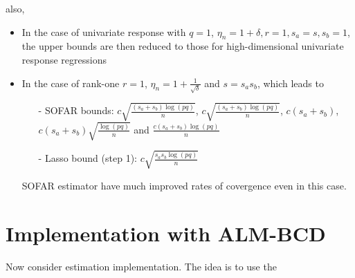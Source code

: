 \documentclass[twoside]{article}
\begin{document}
also,
\begin{itemize}
    \item In the case of univariate response with $q=1$, $\eta_n=1+\delta,r=1,s_a=s,s_b=1$, the upper bounds are then reduced to those for high-dimensional univariate response regressions
    \item In the case of rank-one $r=1$, $\eta_n = 1+\frac{1}{\sqrt{\delta}}$ and $s=s_as_b$, which leads to
    \begin{itemize}
        \item[-] SOFAR bounds: $c\sqrt{\frac{(s_a+s_b)\log(pq)}{n}}$, $c\sqrt{\frac{(s_a+s_b)\log(pq)}{n}}$, $c(s_a+s_b)$, $c(s_a+s_b)\sqrt{\frac{\log(pq)}{n}}$ and $\frac{c(s_a+s_b)\log(pq)}{n}$
        \item[-] Lasso bound (step 1): $c\sqrt{\frac{s_as_b\log(pq)}{n}}$
    \end{itemize}
    SOFAR estimator have much improved rates of covergence even in this case.
\end{itemize}

\section{Implementation with ALM-BCD}
Now consider estimation implementation. The idea is to use the 


%
%
\end{document}
